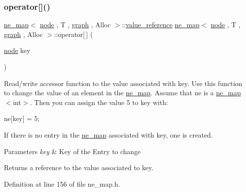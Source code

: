 \subsubsection{\texorpdfstring{operator[]()}{operator[]()}\hspace{0.1cm}{\footnotesize\ttfamily [1/2]}}
{\footnotesize\ttfamily \mbox{\hyperlink{classne__map}{ne\+\_\+map}}$<$ \mbox{\hyperlink{classnode}{node}} , T , \mbox{\hyperlink{classgraph}{graph}} , Alloc $>$\+::\mbox{\hyperlink{classne__map_a3de60750d102f8992a215b0fe645014d}{value\+\_\+reference}} \mbox{\hyperlink{classne__map}{ne\+\_\+map}}$<$ \mbox{\hyperlink{classnode}{node}} , T , \mbox{\hyperlink{classgraph}{graph}} , Alloc $>$\+::operator\mbox{[}$\,$\mbox{]} (\begin{DoxyParamCaption}\item[{\mbox{\hyperlink{classnode}{node}}}]{key }\end{DoxyParamCaption})\hspace{0.3cm}{\ttfamily [inherited]}}

Read/write accessor function to the value associated with {\ttfamily key}. Use this function to change the value of an element in the {\ttfamily \mbox{\hyperlink{classne__map}{ne\+\_\+map}}}. Assume that {\ttfamily ne} is a {\ttfamily \mbox{\hyperlink{classne__map}{ne\+\_\+map}}$<$int$>$}. Then you can assign the value 5 to {\ttfamily key} with\+: 
\begin{DoxyPre}
  ne[key] = 5;
\end{DoxyPre}


If there is no entry in the {\ttfamily \mbox{\hyperlink{classne__map}{ne\+\_\+map}}} associated with {\ttfamily key}, one is created.


\begin{DoxyParams}{Parameters}
{\em key} & Key of the Entry to change \\
\hline
\end{DoxyParams}
\begin{DoxyReturn}{Returns}
a reference to the value associated to {\ttfamily key}. 
\end{DoxyReturn}


Definition at line 156 of file ne\+\_\+map.\+h.


